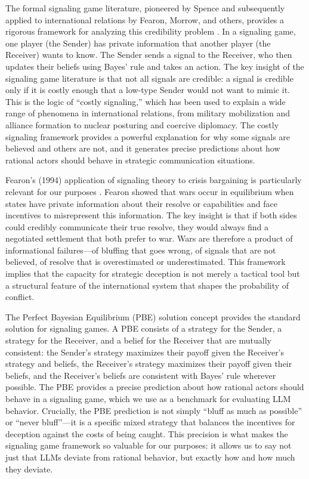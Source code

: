 \documentclass[12pt]{article}
\theoremstyle{plain}
\theoremstyle{definition}
\begin{document}
The formal signaling game literature, pioneered by Spence \citep{Spence1973} and subsequently applied to international relations by Fearon, Morrow, and others, provides a rigorous framework for analyzing this credibility problem \citep{Fearon1994, Morrow1989}. In a signaling game, one player (the Sender) has private information that another player (the Receiver) wants to know. The Sender sends a signal to the Receiver, who then updates their beliefs using Bayes' rule and takes an action. The key insight of the signaling game literature is that not all signals are credible: a signal is credible only if it is costly enough that a low-type Sender would not want to mimic it. This is the logic of ``costly signaling,'' which has been used to explain a wide range of phenomena in international relations, from military mobilization and alliance formation to nuclear posturing and coercive diplomacy. The costly signaling framework provides a powerful explanation for why some signals are believed and others are not, and it generates precise predictions about how rational actors should behave in strategic communication situations.

Fearon's (1994) application of signaling theory to crisis bargaining is particularly relevant for our purposes \citep{Fearon1994}. Fearon showed that wars occur in equilibrium when states have private information about their resolve or capabilities and face incentives to misrepresent this information. The key insight is that if both sides could credibly communicate their true resolve, they would always find a negotiated settlement that both prefer to war. Wars are therefore a product of informational failures---of bluffing that goes wrong, of signals that are not believed, of resolve that is overestimated or underestimated. This framework implies that the capacity for strategic deception is not merely a tactical tool but a structural feature of the international system that shapes the probability of conflict.

The Perfect Bayesian Equilibrium (PBE) solution concept provides the standard solution for signaling games. A PBE consists of a strategy for the Sender, a strategy for the Receiver, and a belief for the Receiver that are mutually consistent: the Sender's strategy maximizes their payoff given the Receiver's strategy and beliefs, the Receiver's strategy maximizes their payoff given their beliefs, and the Receiver's beliefs are consistent with Bayes' rule wherever possible. The PBE provides a precise prediction about how rational actors should behave in a signaling game, which we use as a benchmark for evaluating LLM behavior. Crucially, the PBE prediction is not simply ``bluff as much as possible'' or ``never bluff''---it is a specific mixed strategy that balances the incentives for deception against the costs of being caught. This precision is what makes the signaling game framework so valuable for our purposes: it allows us to say not just that LLMs deviate from rational behavior, but exactly how and how much they deviate.
\end{document}
